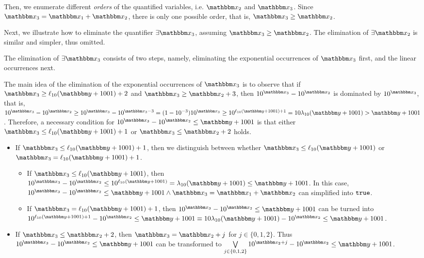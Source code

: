 Then, we enumerate different \emph{orders} of the quantified variables, i.e. $\ivarx_2$ and $\ivarx_3$. Since $\ivarx_3 = \ivarx_1 + \ivarx_2$, there is only one possible order, that is, $\ivarx_3 \ge \ivarx_2$.

Next, we illustrate how to eliminate the quantifier $\exists \ivarx_3$, assuming $\ivarx_3 \ge \ivarx_2$. The elimination of $\exists \ivarx_2$ is similar and simpler, thus omitted.

The elimination of $\exists \ivarx_3$ consists of two steps, namely, eliminating the exponential occurrences of $\ivarx_3$ first, and the linear occurrences next.

The main idea of the elimination of the exponential occurrences of $\ivarx_3$ is to observe that if $\ivarx_3 \ge \ell_{10}(\ivary+1001)+2$ and $\ivarx_3 \ge \ivarx_2 + 3$, then $10^{\ivarx_3} - 10^{\ivarx_2}$ is dominated by $10^{\ivarx_3}$, that is, $10^{\ivarx_3} - 10^{\ivarx_2} \ge 10^{\ivarx_3} - 10^{\ivarx_3 - 3} = (1-10^{-3}) 10^{\ivarx_3} \ge 10^{\ell_{10}(\ivary+1001)+1} = 10\lambda_{10}(\ivary+1001) > \ivary+1001$. Therefore, a necessary condition for $10^{\ivarx_3} - 10^{\ivarx_2} \le \ivary + 1001$ is that either $\ivarx_3 \le \ell_{10}(\ivary+1001)+1$ or $\ivarx_3 \le \ivarx_2 + 2$ holds.  

\begin{itemize}
\item If $\ivarx_3 \le \ell_{10}(\ivary+1001)+1$, then we distinguish between whether $\ivarx_3 \le \ell_{10}(\ivary+1001)$ or  $\ivarx_3 = \ell_{10}(\ivary+1001)+1$. 
\begin{itemize}
\item If $\ivarx_3 \le \ell_{10}(\ivary+1001)$, then $10^{\ivarx_3} - 10^{\ivarx_2} \le 10^{\ell_{10}(\ivary+1001)} = \lambda_{10}(\ivary+1001) \le \ivary + 1001$. In this case, $10^{\ivarx_3} - 10^{\ivarx_2} \le \ivary + 1001 \wedge \ivarx_3 = \ivarx_1 + \ivarx_2$ can simplified into $\mathtt{true}$.
%
\item If $\ivarx_3 = \ell_{10}(\ivary+1001)+1$, then $10^{\ivarx_3} - 10^{\ivarx_2} \le \ivary + 1001$ can be turned into $10^{\ell_{10}(\ivary+1001)+1} - 10^{\ivarx_2} \le \ivary + 1001 \equiv 10 \lambda_{10}(\ivary+1001) - 10^{\ivarx_2} \le \ivary + 1001 $.
\end{itemize} 
%
\item If $\ivarx_3 \le \ivarx_2 + 2$, then $\ivarx_3 = \ivarx_2 + j$ for $j \in \{0,1,2\}$. Thus $10^{\ivarx_3} - 10^{\ivarx_2} \le \ivary + 1001$ can be transformed to $\bigvee \limits_{j \in \{0,1,2\}} 10^{\ivarx_2 + j} - 10^{\ivarx_2} \le \ivary + 1001$.
\end{itemize}


